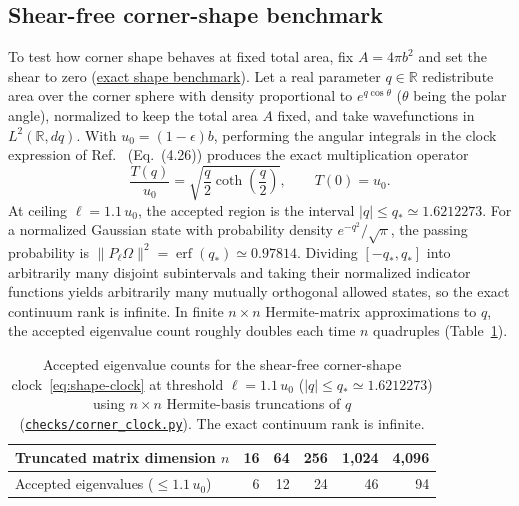 \documentclass[10pt,a4paper]{article}
\numberwithin{equation}{section}
\newcommand{\repo}[2]{\href{https://github.com/sprajs/quantum-gravity/blob/main/#1}{#2}}
\begin{document}
\subsection{Shear-free corner-shape benchmark}

To test how corner shape behaves at fixed total area, fix $A=4\pi b^2$ and set the shear to zero (\repo{audit/regulator-program.md}{exact shape benchmark}).
Let a real parameter $q\in\mathbb{R}$ redistribute area over the corner sphere with density proportional to $e^{q\cos\theta}$ ($\theta$ being the polar angle), normalized to keep the total area $A$ fixed, and take wavefunctions in $L^2(\mathbb{R},dq)$.
With $u_0=(1-\epsilon)b$, performing the angular integrals in the clock expression of Ref.~\cite{Chandrasekaran2026} (Eq.~(4.26)) produces the exact multiplication operator
\begin{equation}
  \frac{T(q)}{u_0} = \sqrt{\frac{q}{2}\coth\!\left(\frac{q}{2}\right)},
  \qquad T(0) = u_0.
  \label{eq:shape-clock}
\end{equation}
At ceiling $\ell = 1.1\,u_0$, the accepted region is the interval $|q| \le q_* \simeq 1.6212273$.
For a normalized Gaussian state with probability density $e^{-q^2}/\sqrt{\pi}$, the passing probability is $\|P_\ell\Omega\|^2 = \operatorname{erf}(q_*) \simeq 0.97814$.
Dividing $[-q_*,q_*]$ into arbitrarily many disjoint subintervals and taking their normalized indicator functions yields arbitrarily many mutually orthogonal allowed states, so the exact continuum rank is infinite.
In finite $n\times n$ Hermite-matrix approximations to $q$, the accepted eigenvalue count roughly doubles each time $n$ quadruples (Table~\ref{tab:corner-clock}).

\begin{table}[htbp]
\centering
\caption{Accepted eigenvalue counts for the shear-free corner-shape clock~\eqref{eq:shape-clock} at threshold $\ell = 1.1\,u_0$ ($|q|\le q_*\simeq 1.6212273$) using $n\times n$ Hermite-basis truncations of $q$ (\repo{checks/corner_clock.py}{\texttt{checks/corner\_clock.py}}). The exact continuum rank is infinite.}
\label{tab:corner-clock}
\begin{tabular}{@{}lrrrrr@{}}
\toprule
Truncated matrix dimension $n$ & 16 & 64 & 256 & 1,024 & 4,096 \\
\midrule
Accepted eigenvalues ($\le 1.1\,u_0$) & 6 & 12 & 24 & 46 & 94 \\
\bottomrule
\end{tabular}
\end{table}
\end{document}
